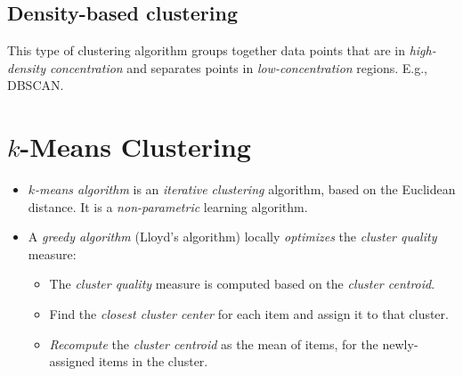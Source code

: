 \documentclass[
	number={6},
	title={Clustering}
]{cs584notes}
\begin{document}
\subsection{Density-based clustering}\label{subsec:density-based-clustering}
This type of clustering algorithm groups together data points that are in \emph{high-density concentration} and separates points in \emph{low-concentration} regions.
E.g., DBSCAN\@.

\section{$k$-Means Clustering}\label{sec:k-means-clustering}
\begin{itemize}
	\item \emph{$k$-means algorithm} is an \emph{iterative clustering} algorithm, based on the Euclidean distance.
	It is a \emph{non-parametric} learning algorithm.
	\item A \emph{greedy algorithm} (Lloyd's algorithm) locally \emph{optimizes} the \emph{cluster quality} measure:
	\begin{itemize}
		\item The \emph{cluster quality} measure is computed based on the \emph{cluster centroid}.
		\item Find the \emph{closest cluster center} for each item and assign it to that cluster.
		\item \emph{Recompute} the \emph{cluster centroid} as the mean of items, for the newly-assigned items in the cluster.
	\end{itemize}
\end{itemize}
\end{document}
